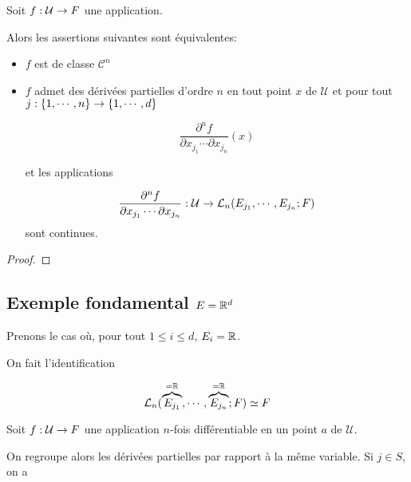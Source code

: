 \begin{proposition} 
	Soit $\GSfunction{f}{\mathcal{U}}{F}$ une application.

	Alors les assertions suivantes sont équivalentes:

	\begin{itemize}
		\item $f$ est de classe $\mathcal{C}^{n}$
		\item $f$ admet des dérivées partielles d'ordre $n$ en tout point $x$ de
			$\mathcal{U}$ et pour tout $j : \GSset{1, \cdots, n} \rightarrow
			\GSset{1, \cdots, d}$

			\begin{equation*}
				\frac{\partial^{n} f}{\partial x_{j_{1}} \cdots \partial
				x_{j_{n}}} (x)
			\end{equation*}

			et les applications

			\begin{equation*}
				\frac{\partial^{n} f}{\partial x_{j_{1}} \cdots \partial
				x_{j_{n}}} : \mathcal{U} \rightarrow
				\GScontinueHomo[n]{E_{j_{1}}, \cdots, E_{j_{n}}}{F}
			\end{equation*}
			sont continues.
	\end{itemize}
\end{proposition}

\ifdefined\outputproof
\begin{proof}

\end{proof}
\fi

\subsection{Exemple fondamental $E = \real^{d}$}

Prenons le cas où, pour tout $1 \leq i \leq d$, $E_{i} = \real$.

On fait l'identification

\begin{equation*}
	\GScontinueHomo[n]{\overbrace{E_{j_{1}}}^{= \real}, \cdots,
	\overbrace{E_{j_{n}}}^{= \real}}{F} \isomorph F
\end{equation*}

Soit $\GSfunction{f}{\mathcal{U}}{F}$ une application $n$-fois différentiable en
un point $a$ de $\mathcal{U}$.

On regroupe alors les dérivées partielles par rapport à la même variable. Si $j
\in S$, on a

